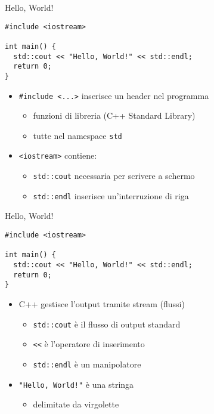 \documentclass[xcolor=dvipsnames,handout]{beamer}
\begin{document}
\begin{frame}[fragile]{Hello, World!}
  \vfill
  \begin{lstlisting}
#include <iostream>

int main() {
  std::cout << "Hello, World!" << std::endl;
  return 0;
}
  \end{lstlisting}
  \vfill
  \begin{itemize}
    \item \lstinline$#include <...>$ inserisce un \alert{header} nel programma
    \begin{itemize}
      \item funzioni di libreria (C++ Standard Library)
      \item tutte nel \alert{namespace} \lstinline$std$
    \end{itemize}
    \vfill
    \item \lstinline$<iostream>$ contiene:
    \begin{itemize}
      \item \lstinline$std::cout$ necessaria per scrivere a schermo
      \item \lstinline$std::endl$ inserisce un'interruzione di riga
    \end{itemize}
  \end{itemize}
  \vfill
\end{frame}

\begin{frame}[fragile]{Hello, World!}
  \vfill
  \begin{lstlisting}
#include <iostream>

int main() {
  std::cout << "Hello, World!" << std::endl;
  return 0;
}
  \end{lstlisting}
  \vfill
  \begin{itemize}
    \item C++ gestisce l'output tramite \alert{stream} (flussi)
    \begin{itemize}
      \item \lstinline$std::cout$ è il flusso di output standard
      \item \lstinline$<<$ è l'operatore di \alert{inserimento}
      \item \lstinline$std::endl$ è un \alert{manipolatore}
    \end{itemize}
    \vfill
    \item \lstinline$"Hello, World!"$ è una \alert{stringa}
    \begin{itemize}
      \item delimitate da \alert{virgolette}
    \end{itemize}
  \end{itemize}
  \vfill
\end{frame}
\end{document}
